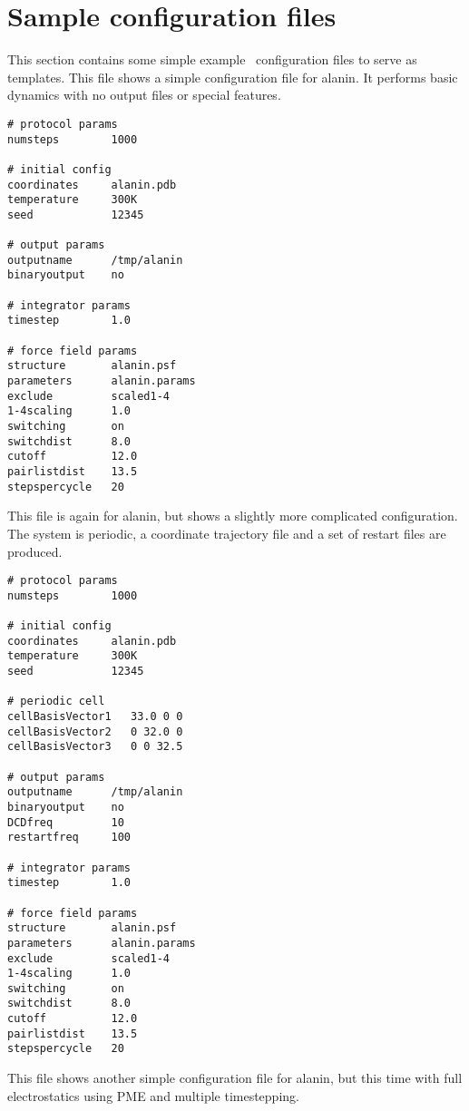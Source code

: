 \section{Sample configuration files}
\label{section:sample}
This section contains some simple example \NAMD\ configuration files to serve
as templates.
\prettypar
This file shows a simple configuration file for alanin.  
It performs basic dynamics
with no output files or special features.

\begin{verbatim}
# protocol params
numsteps        1000

# initial config
coordinates     alanin.pdb
temperature     300K
seed            12345

# output params
outputname      /tmp/alanin
binaryoutput    no

# integrator params
timestep        1.0

# force field params
structure       alanin.psf
parameters      alanin.params
exclude         scaled1-4
1-4scaling      1.0
switching       on
switchdist      8.0
cutoff          12.0
pairlistdist    13.5
stepspercycle   20
\end{verbatim}

\newpage
This file is again for alanin, 
but shows a slightly more complicated configuration.  
The system is periodic, a coordinate trajectory file
and a set of restart files are produced.

\begin{verbatim}
# protocol params
numsteps        1000

# initial config
coordinates     alanin.pdb
temperature     300K
seed            12345

# periodic cell
cellBasisVector1   33.0 0 0
cellBasisVector2   0 32.0 0
cellBasisVector3   0 0 32.5

# output params
outputname      /tmp/alanin
binaryoutput    no
DCDfreq         10
restartfreq     100

# integrator params
timestep        1.0

# force field params
structure       alanin.psf
parameters      alanin.params
exclude         scaled1-4
1-4scaling      1.0
switching       on
switchdist      8.0
cutoff          12.0
pairlistdist    13.5
stepspercycle   20
\end{verbatim}

\newpage
This file shows another simple configuration file for alanin, 
but this time with full electrostatics using PME and 
multiple timestepping.

